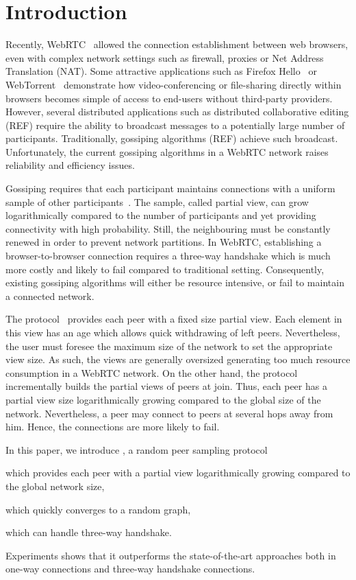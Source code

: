 
\section{Introduction}

Recently, WebRTC~\cite{webrtc} allowed the connection establishment between
web browsers, even with complex network settings such as firewall, proxies or
Net Address Translation (NAT).  Some attractive applications such as Firefox
Hello~\cite{firefoxhello} or WebTorrent~\cite{webtorrent} demonstrate how
video-conferencing or file-sharing directly within browsers becomes simple of
access to end-users without third-party providers. However, several distributed
applications such as distributed collaborative editing (REF) require the
ability to broadcast messages to a potentially large number of
participants. Traditionally, gossiping algorithms (REF) achieve such
broadcast. Unfortunately, the current gossiping algorithms in a WebRTC network
raises reliability and efficiency issues.

Gossiping requires that each participant maintains connections with a uniform
sample of other participants~\cite{jelasity2004peer}. The sample, called
partial view, can grow logarithmically compared to the number of participants
and yet providing connectivity with high probability. Still, the neighbouring
must be constantly renewed in order to prevent network partitions. In WebRTC,
establishing a browser-to-browser connection requires a three-way handshake
which is much more costly and likely to fail compared to traditional
setting. Consequently, existing gossiping algorithms will either be resource
intensive, or fail to maintain a connected network.

The \CYCLON{} protocol~\cite{voulgaris2005cyclon} provides each peer with a
fixed size partial view.  Each element in this view has an age which allows
quick withdrawing of left peers. Nevertheless, the user must foresee the
maximum size of the network to set the appropriate view size. As such, the
views are generally oversized generating too much resource consumption in a
WebRTC network. On the other hand, the \SCAMP{}
protocol~\cite{ganesh2001scamp,ganesh2003peer} incrementally builds the partial
views of peers at join. Thus, each peer has a partial view size logarithmically
growing compared to the global size of the network. Nevertheless, a peer may
connect to peers at several hops away from him. Hence, the connections are more
likely to fail.

In this paper, we introduce \SCAMPLON{}, a random peer sampling protocol
\begin{inparaenum}[(i)]
\item which provides each peer with a partial view logarithmically growing
  compared to the global network size,
\item which quickly converges to a random graph,
\item which can handle three-way handshake.
\end{inparaenum}
Experiments shows that it outperforms the state-of-the-art approaches both in
one-way connections and three-way handshake connections.


